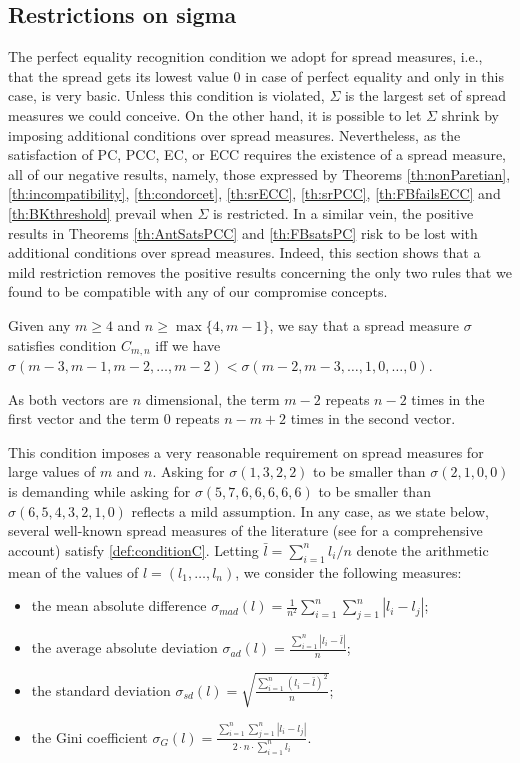 \subsection{Restrictions on sigma}
\label{sec:RestrictionOnSigma}
The perfect equality recognition condition we adopt for spread measures, i.e., that the spread gets its lowest value $0$ in case of perfect equality and only in this case, is very basic. Unless this condition is violated, $\Sigma$ is the largest set of spread measures we could conceive. On the other hand, it is possible to let $\Sigma$ shrink by imposing additional conditions over spread measures. Nevertheless, as the satisfaction of PC, PCC, EC, or ECC requires the existence of a spread measure, all of our negative results, namely, those expressed by Theorems \ref{th:nonParetian}, \ref{th:incompatibility}, \ref{th:condorcet}, \ref{th:srECC}, \ref{th:srPCC}, \ref{th:FBfailsECC} and \ref{th:BKthreshold} prevail when $\Sigma$ is restricted. In a similar vein, the positive results in Theorems \ref{th:AntSatsPCC} and \ref{th:FBsatsPC} risk to be lost with additional conditions over spread measures.
Indeed, this section shows that a mild restriction removes the positive results concerning the only two rules that we found to be compatible with any of our compromise concepts.

\begin{definition}
	\label{def:conditionC}
	Given any $m\geq4$ and $n\geq \max\{4,m-1\}$, we say that a spread measure $\sigma$ satisfies condition $C_{m,n}$ iff we have $\sigma(m-3, m-1, m-2, \dots, m-2) < \sigma(m-2, m-3, \dots, 1, 0, \dots, 0)$.
\end{definition}

As both vectors are $n$ dimensional, the term $m-2$ repeats $n-2$ times in the first vector and the term $0$ repeats $n-m+2$ times in the second vector.

This condition imposes a very reasonable requirement on spread measures for large values of $m$ and $n$. Asking for $\sigma(1,3,2,2)$ to be smaller than $\sigma(2,1,0,0)$ is demanding while asking for $\sigma(5,7,6,6,6,6,6)$ to be smaller than $\sigma(6,5,4,3,2,1,0)$ reflects a mild assumption. In any case, as we state below, several well-known spread measures of the literature (see \citet{Allison1978} for a comprehensive account) satisfy \cref{def:conditionC}. Letting $\bar{l} = \sum_{i=1}^{n} l_i / n$ denote the arithmetic mean of the values of $l = (l_1, …, l_n)$, we consider the following measures:

\begin{itemize}
	\item the mean absolute difference $\sigma_{mad}(l)= \frac{1}{n^2} \sum_{i=1}^{n}\sum_{j=1}^{n}|l_i-l_j|$;
	\item the average absolute deviation $\sigma_{ad}(l)= \frac{\sum_{i=1}^{n}|l_i-\bar{l}|}{n}$;
	\item the standard deviation $\sigma_{sd}(l)= \sqrt{\frac{\sum_{i=1}^{n}(l_i-\bar{l})^2}{n}}$;
	\item the Gini coefficient $\sigma_{G}(l)= \frac{\sum_{i=1}^{n}\sum_{j=1}^{n}|l_i-l_j|}{2 \cdot n \cdot \sum_{i=1}^{n} l_i}$.
\end{itemize} 

